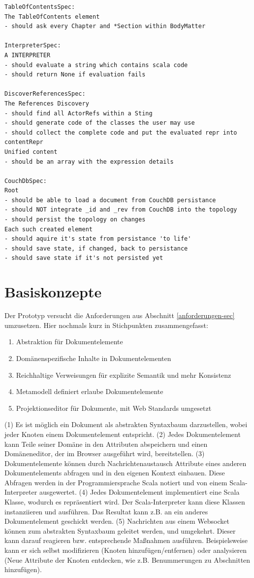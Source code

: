 \begin{verbatim}
TableOfContentsSpec:
The TableOfContents element
- should ask every Chapter and *Section within BodyMatter

InterpreterSpec:
A INTERPRETER
- should evaluate a string which contains scala code
- should return None if evaluation fails

DiscoverReferencesSpec:
The References Discovery
- should find all ActorRefs within a Sting
- should generate code of the classes the user may use
- should collect the complete code and put the evaluated repr into contentRepr
Unified content
- should be an array with the expression details

CouchDbSpec:
Root
- should be able to load a document from CouchDB persistance
- should NOT integrate _id and _rev from CouchDB into the topology
- should persist the topology on changes
Each such created element
- should aquire it's state from persistance 'to life'
- should save state, if changed, back to persistance
- should save state if it's not persisted yet
\end{verbatim}
 
\section{Basiskonzepte}\label{basiskonzepte}
 
Der Prototyp versucht die Anforderungen aus Abschnitt \ref{anforderungen-sec} umzusetzen. Hier nochmals kurz in Stichpunkten zusammengefasst:

 
\begin{enumerate}

\item Abstraktion für Dokumentelemente
\item Domänenspezifische Inhalte in Dokumentelementen
\item Reichhaltige Verweisungen für explizite Semantik und mehr Konsistenz
\item Metamodell definiert erlaube Dokumentelemente
\item Projektionseditor für Dokumente, mit Web Standards umgesetzt
\end{enumerate}
 
(1) Es ist möglich ein Dokument als abstrakten Syntaxbaum darzustellen, wobei jeder Knoten einem Dokumentelement entspricht. (2) Jedes Dokumentelement kann Teile seiner Domäne in den Attributen abspeichern und einen Domäneneditor, der im Browser ausgeführt wird, bereitstellen. (3) Dokumentelemente können durch Nachrichtenaustausch Attribute eines anderen Dokumentelements abfragen und in den eigenen Kontext einbauen. Diese Abfragen werden in der Programmiersprache Scala notiert und von einem Scala-Interpreter ausgewertet. (4) Jedes Dokumentelement implementiert eine Scala Klasse, wodurch es repräsentiert wird. Der Scala-Interpreter kann diese Klassen instanziieren und ausführen. Das Resultat kann z.B. an ein anderes Dokumentelement geschickt werden. (5) Nachrichten aus einem Websocket können zum abstrakten Syntaxbaum geleitet werden, und umgekehrt. Dieser kann darauf reagieren bzw. entsprechende Maßnahmen ausführen. Beispielsweise kann er sich selbst modifizieren (Knoten hinzufügen/entfernen) oder analysieren (Neue Attribute der Knoten entdecken, wie z.B. Benummerungen zu Abschnitten hinzufügen).

